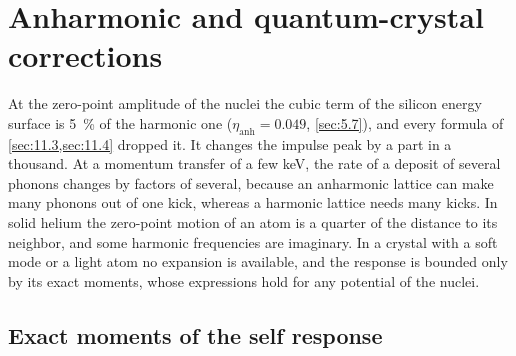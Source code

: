 \section{Anharmonic and quantum-crystal corrections}\label{sec:11.5}

At the zero-point amplitude of the nuclei the cubic term of the silicon energy surface is \SI{5}{\percent} of the harmonic one ($\eta_{\mathrm{anh}} = 0.049$, \cref{sec:5.7}), and every formula of \cref{sec:11.3,sec:11.4} dropped it. It changes the impulse peak by a part in a thousand. At a momentum transfer of a few keV, the rate of a deposit of several phonons changes by factors of several, because an anharmonic lattice can make many phonons out of one kick, whereas a harmonic lattice needs many kicks. In solid helium the zero-point motion of an atom is a quarter of the distance to its neighbor, and some harmonic frequencies are imaginary. In a crystal with a soft mode or a light atom no expansion is available, and the response is bounded only by its exact moments, whose expressions hold for any potential of the nuclei.

\subsection{Exact moments of the self response}

